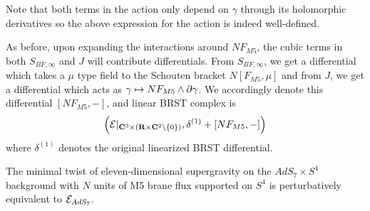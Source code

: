 \documentclass[../main.tex]{subfiles}
\begin{document}
\begin{rmk}
Note that both terms in the action only depend on $\gamma$ through its holomorphic derivatives so the above expression for the action is indeed well-defined. 

As before, upon expanding the interactions around $NF_{M5}$, the cubic terms in both $S_{BF,\infty}$ and $J$ will contribute differentials. From $S_{BF,\infty}$, we get a differential which takes a $\mu$ type field to the Schouten bracket $N[F_{M5}, \mu]$ and from $J$, we get a differential which acts as $\gamma\mapsto N F_{M5} \wedge \partial \gamma$. We accordingly denote this differential $[NF_{M5}, - ] $, and linear BRST complex is
\[
\left (\mathcal{E} |_{\mathbf{C}^3\times (\mathbf{R}\times \mathbf{C}^2\setminus \{0\} )}, \delta^{(1)} + [NF_{M5},-] \right )
\] where $\delta^{(1)}$ denotes the original linearized BRST differential.
\end{rmk}

\begin{conj}\label{conj:ads7}
The minimal twist of eleven-dimensional supergravity on the $AdS_7\times S^4$ background with $N$ units of M5 brane flux supported on $S^4$ is perturbatively equivalent to $\mathcal{E}_{AdS_7}$. 
\end{conj}

\end{document}
